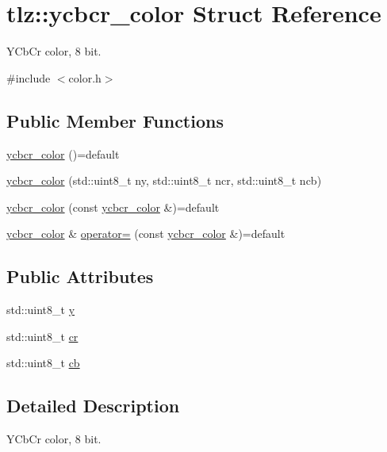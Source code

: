 \hypertarget{structtlz_1_1ycbcr__color}{}\section{tlz\+:\+:ycbcr\+\_\+color Struct Reference}
\label{structtlz_1_1ycbcr__color}


Y\+Cb\+Cr color, 8 bit.  




{\ttfamily \#include $<$color.\+h$>$}

\subsection*{Public Member Functions}
\begin{DoxyCompactItemize}
\item 
\hyperlink{structtlz_1_1ycbcr__color_af5391170d5df1394c5f5284b14e84f6c}{ycbcr\+\_\+color} ()=default
\item 
\hyperlink{structtlz_1_1ycbcr__color_a5b2abb42741e012ef82ea8cdc88c1d92}{ycbcr\+\_\+color} (std\+::uint8\+\_\+t ny, std\+::uint8\+\_\+t ncr, std\+::uint8\+\_\+t ncb)
\item 
\hyperlink{structtlz_1_1ycbcr__color_a57e92511b21156e85f730295eb80fd9c}{ycbcr\+\_\+color} (const \hyperlink{structtlz_1_1ycbcr__color}{ycbcr\+\_\+color} \&)=default
\item 
\hyperlink{structtlz_1_1ycbcr__color}{ycbcr\+\_\+color} \& \hyperlink{structtlz_1_1ycbcr__color_a3763036c691a8ff538708b44202e47ad}{operator=} (const \hyperlink{structtlz_1_1ycbcr__color}{ycbcr\+\_\+color} \&)=default
\end{DoxyCompactItemize}
\subsection*{Public Attributes}
\begin{DoxyCompactItemize}
\item 
std\+::uint8\+\_\+t \hyperlink{structtlz_1_1ycbcr__color_affd190ed3ca65a9e75080a22b149a1d2}{y}
\item 
std\+::uint8\+\_\+t \hyperlink{structtlz_1_1ycbcr__color_afa551c8ab50c0f44d39eb215603f1960}{cr}
\item 
std\+::uint8\+\_\+t \hyperlink{structtlz_1_1ycbcr__color_a8ae3049dcb5bb1cf2c21790530060eb4}{cb}
\end{DoxyCompactItemize}


\subsection{Detailed Description}
Y\+Cb\+Cr color, 8 bit. 

